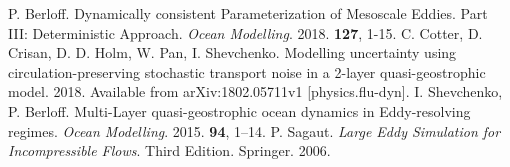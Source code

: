\documentclass[10pt]{article}
\begin{document}
\begin{thebibliography}{9}
	  P. Berloff. Dynamically consistent Parameterization of Mesoscale Eddies. Part III: Deterministic Approach. \textit{Ocean Modelling}. 2018. \textbf{127}, 1-15.
	 C. Cotter, D. Crisan, D. D. Holm, W. Pan, I. Shevchenko. Modelling uncertainty using circulation-preserving stochastic transport noise in a 2-layer quasi-geostrophic model. 2018. Available from arXiv:1802.05711v1 [physics.flu-dyn].
	 I. Shevchenko, P. Berloff. Multi-Layer quasi-geostrophic ocean dynamics in Eddy-resolving regimes. \textit{Ocean Modelling}. 2015. \textbf{94}, 1–14.
	 P. Sagaut. \textit{Large Eddy Simulation for Incompressible Flows}. Third Edition. Springer. 2006. 
\end{thebibliography}
\end{document}
